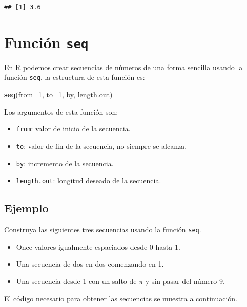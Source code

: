 \documentclass[10pt,]{krantz}
\makeatletter
\newenvironment{Shaded}{\begin{snugshade}}{\end{snugshade}}
\newcommand{\KeywordTok}[1]{\textcolor[rgb]{0.13,0.29,0.53}{\textbf{#1}}}
\newcommand{\DataTypeTok}[1]{\textcolor[rgb]{0.13,0.29,0.53}{#1}}
\newcommand{\DecValTok}[1]{\textcolor[rgb]{0.00,0.00,0.81}{#1}}
\newcommand{\NormalTok}[1]{#1}
\providecommand{\tightlist}{%
  \setlength{\itemsep}{0pt}\setlength{\parskip}{0pt}}
\newenvironment{kframe}{%
\medskip{}
\setlength{\fboxsep}{.8em}
 \def\at@end@of@kframe{}%
 \ifinner\ifhmode%
  \def\at@end@of@kframe{\end{minipage}}%
  \begin{minipage}{\columnwidth}%
 \fi\fi%
 \def\FrameCommand##1{\hskip\@totalleftmargin \hskip-\fboxsep
 \colorbox{shadecolor}{##1}\hskip-\fboxsep
     \hskip-\linewidth \hskip-\@totalleftmargin \hskip\columnwidth}%
 \MakeFramed {\advance\hsize-\width
   \@totalleftmargin\z@ \linewidth\hsize
   \@setminipage}}%
 {\par\unskip\endMakeFramed%
 \at@end@of@kframe}
\renewenvironment{Shaded}{\begin{kframe}}{\end{kframe}}
\makeatother
\begin{document}
\begin{verbatim}
## [1] 3.6
\end{verbatim}

\section{\texorpdfstring{Función \texttt{seq} 
}{Función seq  }}\label{funcion-seq}

En R podemos crear secuencias de números de una forma sencilla usando la
función \texttt{seq}, la estructura de esta función es:

\begin{Shaded}
\begin{Highlighting}[]
\KeywordTok{seq}\NormalTok{(}\DataTypeTok{from=}\DecValTok{1}\NormalTok{, }\DataTypeTok{to=}\DecValTok{1}\NormalTok{, by, length.out)}
\end{Highlighting}
\end{Shaded}

Los argumentos de esta función son:

\begin{itemize}
\tightlist
\item
  \texttt{from}: valor de inicio de la secuencia.
\item
  \texttt{to}: valor de fin de la secuencia, no siempre se alcanza.
\item
  \texttt{by}: incremento de la secuencia.
\item
  \texttt{length.out}: longitud deseado de la secuencia.
\end{itemize}

\subsection*{Ejemplo}\label{ejemplo-10}


Construya las siguientes tres secuencias usando la función \texttt{seq}.

\begin{itemize}
\tightlist
\item
  Once valores igualmente espaciados desde 0 hasta 1.
\item
  Una secuencia de dos en dos comenzando en 1.
\item
  Una secuencia desde 1 con un salto de \(\pi\) y sin pasar del número
  9.
\end{itemize}

El código necesario para obtener las secuencias se muestra a
continuación.
\end{document}
